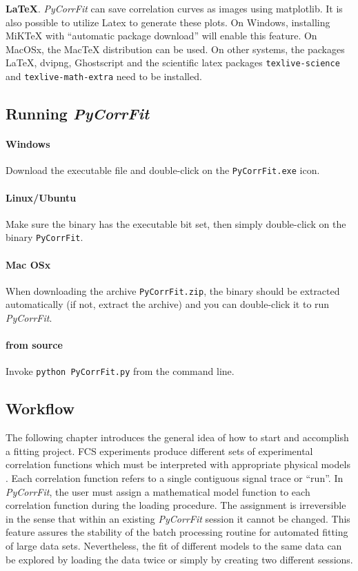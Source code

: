 \noindent \textbf{\LaTeX}.
\textit{PyCorrFit} can save correlation curves as images using matplotlib. It is also possible to utilize Latex to generate these plots. On Windows, installing MiKTeX  with ``automatic package download'' will enable this feature. On MacOSx, the MacTeX distribution can be used. On other systems, the packages LaTeX, dvipng, Ghostscript and the scientific latex packages \texttt{texlive-science} and \texttt{texlive-math-extra} need to be installed.

\subsection{Running \textit{PyCorrFit}}
\label{sec:intro.runni}
\paragraph*{Windows}
Download the executable file and double-click on the \texttt{PyCorrFit.exe} icon.
\paragraph*{Linux/Ubuntu}
Make sure the binary has the executable bit set, then simply double-click on the binary  \texttt{PyCorrFit}.
\paragraph*{Mac OSx}
When downloading the archive \texttt{PyCorrFit.zip}, the binary should be extracted automatically (if not, extract the archive) and you can double-click it to run \textit{PyCorrFit}.
\paragraph*{from source}
Invoke \texttt{python PyCorrFit.py} from the command line.

\subsection{Workflow}
\label{sec:intro.workf}

The following chapter introduces the general idea of how to start and accomplish a fitting project. FCS experiments produce different sets of experimental correlation functions which must be interpreted with appropriate physical models . Each correlation function refers to a single contiguous signal trace or ``run''. In \textit{PyCorrFit}, the user must assign a mathematical model function to each correlation function during the loading procedure. The assignment is irreversible in the sense that within an existing \textit{PyCorrFit} session it cannot be changed. This feature assures the stability of the batch processing routine for automated fitting of large data sets. Nevertheless, the fit of different models to the same data can be explored by loading the data twice or simply by creating two different sessions.

